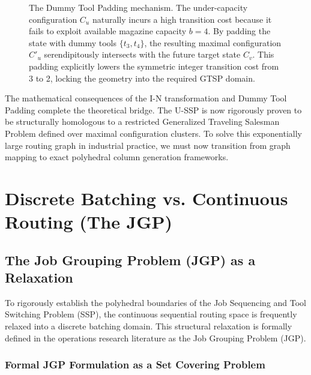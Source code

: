 \documentclass[11pt, a4paper]{book}
\begin{document}
\begin{figure}[H]
		\caption{The Dummy Tool Padding mechanism. The under-capacity configuration $C_u$ naturally incurs a high transition cost because it fails to exploit available magazine capacity $b=4$. By padding the state with dummy tools $\{t_3, t_4\}$, the resulting maximal configuration $C'_u$ serendipitously intersects with the future target state $C_v$. This padding explicitly lowers the symmetric integer transition cost from 3 to 2, locking the geometry into the required GTSP domain.}
		\label{fig:dummy_padding}
	\end{figure}
	
	The mathematical consequences of the I-N transformation and Dummy Tool Padding complete the theoretical bridge. The U-SSP is now rigorously proven to be structurally homologous to a restricted Generalized Traveling Salesman Problem defined over maximal configuration clusters. To solve this exponentially large routing graph in industrial practice, we must now transition from graph mapping to exact polyhedral column generation frameworks.
	
	
	\chapter{Discrete Batching vs. Continuous Routing (The JGP)}
	
	\section{The Job Grouping Problem (JGP) as a Relaxation}
	
	To rigorously establish the polyhedral boundaries of the Job Sequencing and Tool Switching Problem (SSP), the continuous sequential routing space is frequently relaxed into a discrete batching domain. This structural relaxation is formally defined in the operations research literature as the Job Grouping Problem (JGP).
	
	\subsection{Formal JGP Formulation as a Set Covering Problem}
	
\end{document}
